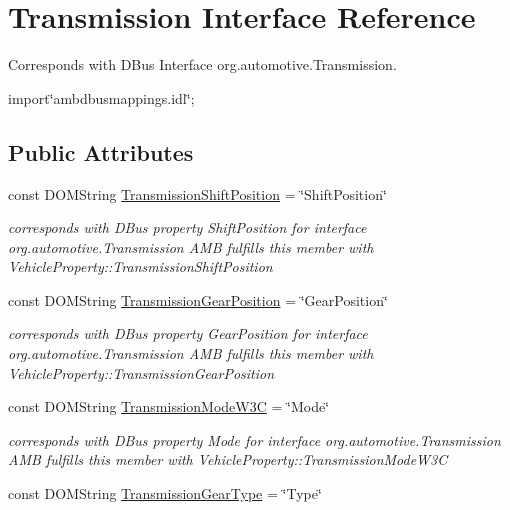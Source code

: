 \hypertarget{interfaceTransmission}{\section{Transmission Interface Reference}
\label{interfaceTransmission}
}


Corresponds with D\+Bus Interface org.\+automotive.\+Transmission.  




{\ttfamily import\char`\"{}ambdbusmappings.\+idl\char`\"{};}

\subsection*{Public Attributes}
\begin{DoxyCompactItemize}
\item 
\hypertarget{interfaceTransmission_a749c8273349cd7689858ed24217049b1}{const D\+O\+M\+String \hyperlink{interfaceTransmission_a749c8273349cd7689858ed24217049b1}{Transmission\+Shift\+Position} = \char`\"{}Shift\+Position\char`\"{}}\label{interfaceTransmission_a749c8273349cd7689858ed24217049b1}

\begin{DoxyCompactList}\small\item\em corresponds with D\+Bus property Shift\+Position for interface org.\+automotive.\+Transmission A\+M\+B fulfills this member with Vehicle\+Property\+::\+Transmission\+Shift\+Position \end{DoxyCompactList}\item 
const D\+O\+M\+String \hyperlink{interfaceTransmission_a0271138d40b3619ffcbfe32f2081d516}{Transmission\+Gear\+Position} = \char`\"{}Gear\+Position\char`\"{}
\begin{DoxyCompactList}\small\item\em corresponds with D\+Bus property Gear\+Position for interface org.\+automotive.\+Transmission A\+M\+B fulfills this member with Vehicle\+Property\+::\+Transmission\+Gear\+Position \end{DoxyCompactList}\item 
\hypertarget{interfaceTransmission_a5f02d4b865d13144dbbff4ca10e731b7}{const D\+O\+M\+String \hyperlink{interfaceTransmission_a5f02d4b865d13144dbbff4ca10e731b7}{Transmission\+Mode\+W3\+C} = \char`\"{}Mode\char`\"{}}\label{interfaceTransmission_a5f02d4b865d13144dbbff4ca10e731b7}

\begin{DoxyCompactList}\small\item\em corresponds with D\+Bus property Mode for interface org.\+automotive.\+Transmission A\+M\+B fulfills this member with Vehicle\+Property\+::\+Transmission\+Mode\+W3\+C \end{DoxyCompactList}\item 
\hypertarget{interfaceTransmission_afdd88c1d4eefa241b0ae1e444c8a7ed6}{const D\+O\+M\+String \hyperlink{interfaceTransmission_afdd88c1d4eefa241b0ae1e444c8a7ed6}{Transmission\+Gear\+Type} = \char`\"{}Type\char`\"{}}\label{interfaceTransmission_afdd88c1d4eefa241b0ae1e444c8a7ed6}


\end{DoxyCompactItemize}
